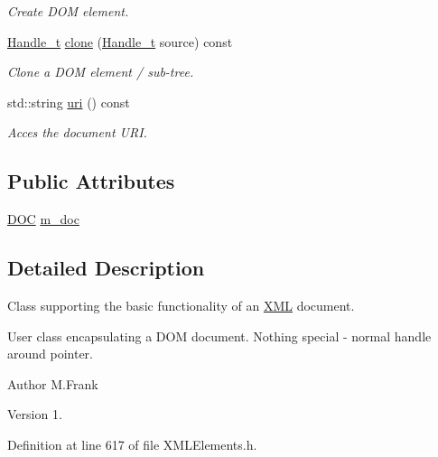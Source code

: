 \begin{DoxyCompactItemize}
\begin{DoxyCompactList}\small\item\em Create D\+OM element. \end{DoxyCompactList}\item 
\hyperlink{class_d_d4hep_1_1_x_m_l_1_1_handle__t}{Handle\+\_\+t} \hyperlink{class_d_d4hep_1_1_x_m_l_1_1_document_a47d813664ed46e4b7e718cba9d6c02da}{clone} (\hyperlink{class_d_d4hep_1_1_x_m_l_1_1_handle__t}{Handle\+\_\+t} source) const
\begin{DoxyCompactList}\small\item\em Clone a D\+OM element / sub-\/tree. \end{DoxyCompactList}\item 
std\+::string \hyperlink{class_d_d4hep_1_1_x_m_l_1_1_document_a007b7a2db1441bca8f591f97d9ad2647}{uri} () const
\begin{DoxyCompactList}\small\item\em Acces the document U\+RI. \end{DoxyCompactList}\end{DoxyCompactItemize}
\subsection*{Public Attributes}
\begin{DoxyCompactItemize}
\item 
\hyperlink{class_d_d4hep_1_1_x_m_l_1_1_document_a685ff83de83e9b7b37e79ad846fc2387}{D\+OC} \hyperlink{class_d_d4hep_1_1_x_m_l_1_1_document_a8fad6eeaaafe3a15002cb16fb0b325a3}{m\+\_\+doc}
\end{DoxyCompactItemize}


\subsection{Detailed Description}
Class supporting the basic functionality of an \hyperlink{namespace_d_d4hep_1_1_x_m_l}{X\+ML} document. 

User class encapsulating a D\+OM document. Nothing special -\/ normal handle around pointer.

\begin{DoxyAuthor}{Author}
M.\+Frank 
\end{DoxyAuthor}
\begin{DoxyVersion}{Version}
1. 
\end{DoxyVersion}


Definition at line 617 of file X\+M\+L\+Elements.\+h.



